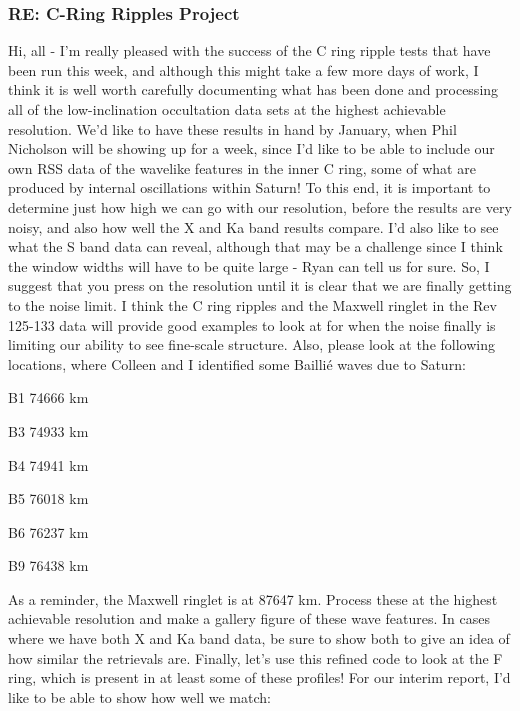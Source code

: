 \documentclass[crop=false,class=article,oneside]{standalone}
\begin{document}
\subsubsection{\footnotesize RE: C-Ring Ripples Project}
Hi, all - I'm really pleased with the success of the C ring ripple tests that have been run this week, and although this might take a few more days of work, I think it is well worth carefully documenting what has been done and processing all of the low-inclination occultation data sets at the highest achievable resolution. We'd like to have these results in hand by January, when Phil Nicholson will be showing up for a week, since I'd like to be able to include our own RSS data of the wavelike features in the inner C ring, some of what are produced by internal oscillations within Saturn!
To this end, it is important to determine just how high we can go with our resolution, before the results are very noisy, and also how well the X and Ka band results compare. I'd also like to see what the S band data can reveal, although that may be a challenge since I think the window widths will have to be quite large - Ryan can tell us for sure. So, I suggest that you press on the resolution until it is clear that we are finally getting to the noise limit. I think the C ring ripples and the Maxwell ringlet in the Rev 125-133 data will provide good examples to look at for when the noise finally is limiting our ability to see fine-scale structure. Also, please look at the following locations, where Colleen and I identified some Baillié waves due to Saturn:
\begin{itemize}
\begin{multicols}{3}
    \item B1 74666 km
    \item B3 74933 km
    \item B4 74941 km
    \item B5 76018 km
    \item B6 76237 km
    \item B9 76438 km
\end{multicols}
\end{itemize}
As a reminder, the Maxwell ringlet is at 87647 km.
Process these at the highest achievable resolution and make a gallery figure of these wave features. In cases where we have both X and Ka band data, be sure to show both to give an idea of how similar the retrievals are. 
Finally, let's use this refined code to look at the F ring, which is present in at least some of these profiles!
For our interim report, I'd like to be able to show how well we match:
\end{document}
